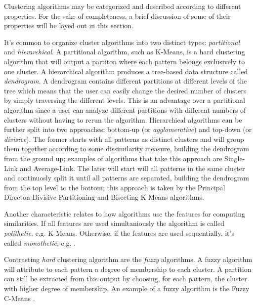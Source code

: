 Clustering algorithms may be categorized and described according to different properties.
For the sake of completeness, a brief discussion of some of their properties will be layed out in this section.

It's common to organize cluster algorithms into two distinct types: \emph{partitional} and \emph{hierarchical}.
A partitional algorithm, such as K-Means, is a hard clustering algorithm that will output a partiton where each pattern belongs exclusively to one cluster.
A hierarchical algorithm produces a tree-based data structure called \emph{dendrogram}.
A dendrogram contains different partitions at different levels of the tree which means that the user can easily change the desired number of clusters by simply traversing the different levels.
This is an advantage over a partitional algorithm since a user can analyze different partitions with different numbers of clusters without having to rerun the algorithm.
Hierarchical algorithms can be further split into two approaches: bottom-up (or \emph{agglomerative}) and top-down (or \emph{divisive}).
The former starts with all patterns as distinct clusters and will group them together according to some dissimilarity measure, building the dendrogram from the ground up; examples of algorithms that take this approach are Single-Link and Average-Link.
The later will start will all patterns in the same cluster and continuosly split it until all patterns are separated, building the dendrogram from the top level to the bottom; this approach is taken by the Principal Directon Divisive Partitioning\cite{Boley1998} and Bisecting K-Means \cite{Steinbach2000} algorithms.


Another characteristic relates to how algorithms use the features for computing similarities.
If all features are used simultaniously the algorithm is called \emph{polithetic}, e.g. K-Means.
Otherwise, if the features are used sequentially, it's called \emph{monothetic}, e.g. \cite{Chavent1998}.

Contrasting \emph{hard} clustering algorithm are the \emph{fuzzy} algorithms.
A fuzzy algorithm will attribute to each pattern a degree of membership to each cluster.
A partition can still be extracted from this output by choosing, for each pattern, the cluster with higher degree of membership.
An example of a fuzzy algorithm is the Fuzzy C-Means \cite{Bezdek1984}.

